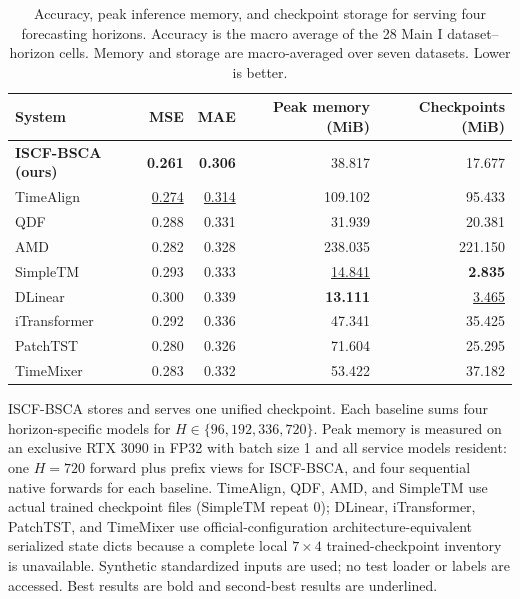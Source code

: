 \begin{table}[t]
\centering
\caption{Accuracy, peak inference memory, and checkpoint storage for serving four forecasting horizons. Accuracy is the macro average of the 28 Main I dataset--horizon cells. Memory and storage are macro-averaged over seven datasets. Lower is better.}
\label{tab:iscf-bsca-efficiency}
\small
\setlength{\tabcolsep}{7pt}
\begin{tabular}{lrrrr}
\toprule
System & MSE & MAE & Peak memory (MiB) & Checkpoints (MiB) \\
\midrule
\textbf{ISCF-BSCA (ours)} & \textbf{0.261} & \textbf{0.306} & 38.817 & 17.677 \\
TimeAlign & \underline{0.274} & \underline{0.314} & 109.102 & 95.433 \\
QDF & 0.288 & 0.331 & 31.939 & 20.381 \\
AMD & 0.282 & 0.328 & 238.035 & 221.150 \\
SimpleTM & 0.293 & 0.333 & \underline{14.841} & \textbf{2.835} \\
DLinear & 0.300 & 0.339 & \textbf{13.111} & \underline{3.465} \\
iTransformer & 0.292 & 0.336 & 47.341 & 35.425 \\
PatchTST & 0.280 & 0.326 & 71.604 & 25.295 \\
TimeMixer & 0.283 & 0.332 & 53.422 & 37.182 \\
\bottomrule
\end{tabular}
\vspace{2pt}
\parbox{0.98\linewidth}{\footnotesize ISCF-BSCA stores and serves one unified checkpoint. Each baseline sums four horizon-specific models for $H\in\{96,192,336,720\}$. Peak memory is measured on an exclusive RTX 3090 in FP32 with batch size 1 and all service models resident: one $H=720$ forward plus prefix views for ISCF-BSCA, and four sequential native forwards for each baseline. TimeAlign, QDF, AMD, and SimpleTM use actual trained checkpoint files (SimpleTM repeat 0); DLinear, iTransformer, PatchTST, and TimeMixer use official-configuration architecture-equivalent serialized state dicts because a complete local $7\times4$ trained-checkpoint inventory is unavailable. Synthetic standardized inputs are used; no test loader or labels are accessed. Best results are bold and second-best results are underlined.}
\end{table}
